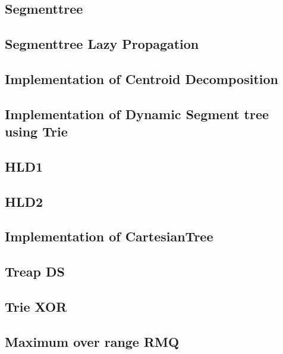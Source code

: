 \subsection{Segmenttree}
\raggedbottom
\hrulefill
\subsection{Segmenttree Lazy Propagation}
\raggedbottom
\hrulefill
\subsection{Implementation of Centroid Decomposition}
\raggedbottom
\hrulefill
\subsection{Implementation of Dynamic Segment tree using Trie}
\raggedbottom
\hrulefill
\subsection{HLD1}
\raggedbottom
\hrulefill
\subsection{HLD2}
\raggedbottom
\hrulefill
\subsection{Implementation of CartesianTree}
\raggedbottom
\hrulefill
\subsection{Treap DS}
\raggedbottom
\hrulefill
\subsection{Trie XOR}
\raggedbottom
\hrulefill
\subsection{Maximum over range RMQ}
\raggedbottom
\hrulefill
